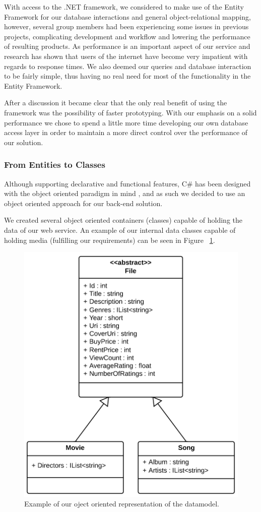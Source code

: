 With access to the .NET framework, we considered to make use of the Entity Framework for our database interactions and general object-relational mapping, however, several group members had been experiencing some issues in previous projects, complicating development and workflow and lowering the performance of resulting products. As performance is an important aspect of our service and research has shown that users of the internet have become very impatient with regards to response times\cite{webusersflee}. We also deemed our queries and database interaction to be fairly simple, thus having no real need for most of the functionality in the Entity Framework.

After a discussion it became clear that the only real benefit of using the framework was the possibility of faster prototyping. With our emphasis on a solid performance we chose to spend a little more time developing our own database access layer in order to maintain a more direct control over the performance of our solution.


\subsubsection{From Entities to Classes}
Although supporting declarative and functional features, C\# has been designed with the object oriented paradigm in mind \cite{csharpecma}, and as such we decided to use an object oriented approach for our back-end solution. 

We created several object oriented containers (classes) capable of holding the data of our web service. An example of our internal data classes capable of holding media (fulfilling our requirements) can be seen in Figure ~\ref{fig:orm}.
\begin{figure}[hbt]
	\centering
	\includegraphics[scale=0.7]{./p1design/orm.png}
	\caption{Example of our oject oriented representation of the datamodel.}
	\label{fig:orm}
\end{figure}


